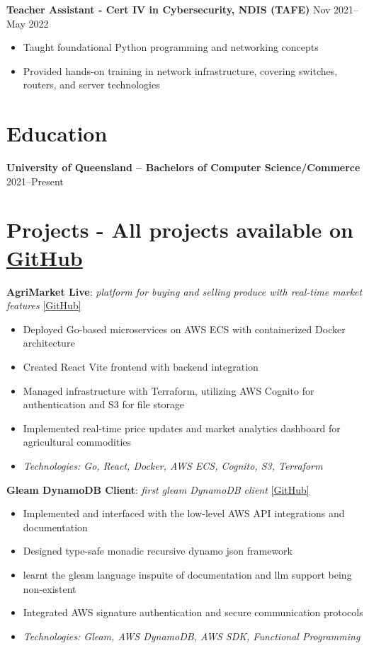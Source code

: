 \documentclass[10pt,a4paper]{article}
\begin{document}
	\textbf{Teacher Assistant - Cert IV in Cybersecurity, NDIS (TAFE)} \hfill Nov 2021--May 2022 
	\begin{itemize}[label=\textbullet, itemsep=0.02cm]
		\item Taught foundational Python programming and networking concepts
		\item Provided hands-on training in network infrastructure, covering switches, routers, and server technologies
	\end{itemize}
	
	\section{Education}
	\textbf{University of Queensland -- Bachelors of Computer Science/Commerce} \hfill 2021--Present \\	
	\section{Projects -  \textbf{All projects available on} \href{https://github.com/CameronBadman}{GitHub} }
	
	\textbf{AgriMarket Live}: \textit{platform for buying and selling produce with real-time market features} \href{https://github.com/CSSE6400/2025_P3_AgriMarket}{[GitHub]}
	\begin{itemize}[label=\textbullet, itemsep=0.05cm]
		\item Deployed Go-based microservices on AWS ECS with containerized Docker architecture
		\item Created React Vite frontend with backend integration
		\item Managed infrastructure with Terraform, utilizing AWS Cognito for authentication and S3 for file storage
		\item Implemented real-time price updates and market analytics dashboard for agricultural commodities
		\item \textit{Technologies: Go, React, Docker, AWS ECS, Cognito, S3, Terraform}
	\end{itemize}
	
	
	\textbf{Gleam DynamoDB Client}: \textit{first gleam DynamoDB client} \href{https://github.com/CameronBadman/gleam-dynamodb}{[GitHub]}
	\begin{itemize}[label=\textbullet, itemsep=0.05cm]
		\item Implemented and interfaced with the low-level AWS API integrations and documentation
		\item Designed type-safe monadic recursive dynamo json framework
		\item learnt the gleam language inspuite of documentation and llm support being non-existent 
		\item Integrated AWS signature authentication and secure communication protocols
		\item \textit{Technologies: Gleam, AWS DynamoDB, AWS SDK, Functional Programming}
	\end{itemize}
	
\end{document}
